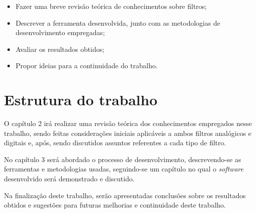 \begin{itemize}
\item Fazer uma breve revisão teórica de conhecimentos sobre filtros;
\item Descrever a ferramenta desenvolvida, junto com as metodologias de desenvolvimento empregadas;
\item Avaliar os resultados obtidos;
\item Propor ideias para a continuidade do trabalho.
\end{itemize}

\section{Estrutura do trabalho}

O capítulo 2 irá realizar uma revisão teórica dos conhecimentos empregados nesse trabalho, sendo feitas considerações iniciais aplicáveis a ambos filtros analógicos e digitais e, após, sendo discutidos assuntos referentes a cada tipo de filtro. 

No capítulo 3 será abordado o processo de desenvolvimento, descrevendo-se as ferramentas e metodologias usadas, seguindo-se um capítulo no qual o \textit{software} desenvolvido será demonstrado e discutido. 

Na finalização deste trabalho, serão apresentadas conclusões sobre os resultados obtidos e sugestões para futuras melhorias e continuidade deste trabalho.

\newpage %
